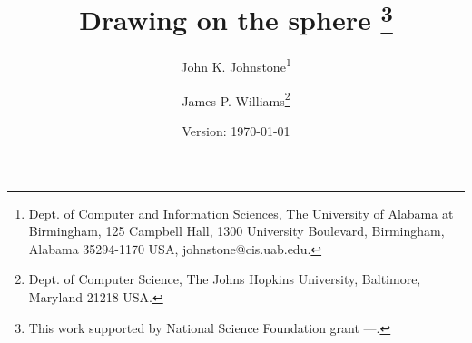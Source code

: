 \newcommand{\SingleSpace}{\edef\baselinestretch{0.9}\Large\normalsize}
\newcommand{\DoubleSpace}{\edef\baselinestretch{1.4}\Large\normalsize}
\newcommand{\Comment}[1]{\relax}  %
\newcommand{\Heading}[1]{\par\noindent{\bf#1}\nobreak}
\newcommand{\Tail}[1]{\nobreak\par\noindent{\bf#1}}
\newcommand{\QED}{\vrule height 1.4ex width 1.0ex depth -.1ex\ } %
\newcommand{\arc}[1]{\mbox{$\stackrel{\frown}{#1}$}}
\newcommand{\lyne}[1]{\mbox{$\stackrel{\leftrightarrow}{#1}$}}
\newcommand{\ray}[1]{\mbox{$\vec{#1}$}}          
\newcommand{\seg}[1]{\mbox{$\overline{#1}$}}
\newcommand{\tab}{\hspace*{.2in}}
\newcommand{\se}{\mbox{$_{\epsilon}$}}  %
\newcommand{\ie}{\mbox{i.e.}}
\newcommand{\eg}{\mbox{e.\ g.\ }}
\newcommand{\figg}[3]{\begin{figure}[htbp]\vspace{#3}\caption{#2}\label{#1}\end{figure}}
\newcommand{\be}{\begin{equation}}
\newcommand{\ee}{\end{equation}}
\newcommand{\prf}{\noindent{{\bf Proof} :\ }}

\newtheorem{rmk}{Remark}[section]
\newtheorem{example}{Example}[section]
\newtheorem{conjecture}{Conjecture}[section]
\newtheorem{claim}{Claim}[section]
\newtheorem{notation}{Notation}[section]
\newtheorem{lemma}{Lemma}[section]
\newtheorem{theorem}{Theorem}[section]
\newtheorem{corollary}{Corollary}[section]
\newtheorem{defn2}{Definition}

\ifFull                                          
\SingleSpace
\else
\DoubleSpace
\fi

\setlength{\oddsidemargin}{0pt}
\setlength{\evensidemargin}{0pt}
\setlength{\headsep}{0pt}
\setlength{\topmargin}{0pt}
\setlength{\textheight}{8.75in}
\setlength{\textwidth}{6.5in}



\setlength{\headsep}{.2in}
\setclock              

\title{Drawing on the sphere
        \thanks{This work supported by National Science Foundation grant
        ---.}}                           
\author{John K. Johnstone\thanks{Dept. of Computer and Information 
	Sciences,
	The University of Alabama at Birmingham,
	125 Campbell Hall, 1300 University Boulevard,
	Birmingham, Alabama  35294-1170 USA, johnstone@cis.uab.edu.}
	\and James P. Williams\thanks{Dept. of Computer Science,
	The Johns Hopkins University, Baltimore, Maryland 21218 USA.}}
\date{Version: \today \clock}



